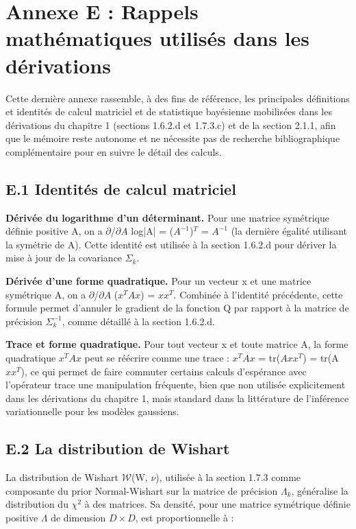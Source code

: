 \section*{Annexe E : Rappels mathématiques utilisés dans les dérivations}
Cette dernière annexe rassemble, à des fins de référence, les principales définitions et identités de calcul matriciel et de statistique bayésienne mobilisées dans les dérivations du chapitre 1 (sections 1.6.2.d et 1.7.3.c) et de la section 2.1.1, afin que le mémoire reste autonome et ne nécessite pas de recherche bibliographique complémentaire pour en suivre le détail des calculs.

\subsection*{E.1 Identités de calcul matriciel}
\textbf{Dérivée du logarithme d'un déterminant. }Pour une matrice symétrique définie positive A, on a $\partial $/$\partial A$ log|A| = ($A^{-1}$)$^{T}$ = $A^{-1}$ (la dernière égalité utilisant la symétrie de A). Cette identité est utilisée à la section 1.6.2.d pour dériver la mise à jour de la covariance $\Sigma _{k}$.

\textbf{Dérivée d'une forme quadratique. }Pour un vecteur x et une matrice symétrique A, on a $\partial $/$\partial A$ ($x^{T}Ax$) = $xx^{T}$. Combinée à l'identité précédente, cette formule permet d'annuler le gradient de la fonction Q par rapport à la matrice de précision $\Sigma _{k}^{-1}$, comme détaillé à la section 1.6.2.d.

\textbf{Trace et forme quadratique. }Pour tout vecteur x et toute matrice A, la forme quadratique $x^{T}Ax$ peut se réécrire comme une trace : $x^{T}Ax$ = tr($Axx^{T}$) = tr(A $xx^{T}$), ce qui permet de faire commuter certains calculs d'espérance avec l'opérateur trace  une manipulation fréquente, bien que non utilisée explicitement dans les dérivations du chapitre 1, mais standard dans la littérature de l'inférence variationnelle pour les modèles gaussiens.

\subsection*{E.2 La distribution de Wishart}
La distribution de Wishart $\mathcal{W}$(W, $\nu $), utilisée à la section 1.7.3 comme composante du prior Normal-Wishart sur la matrice de précision $\Lambda _{k}$, généralise la distribution du $\chi ^{2}$ à des matrices. Sa densité, pour une matrice symétrique définie positive $\Lambda $ de dimension $D\times D$, est proportionnelle à :

